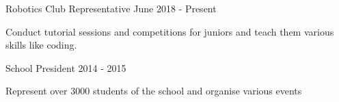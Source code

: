 

\begin{cventries}

  \projects
    {} %
    {Robotics Club Representative} %
    {June 2018 - Present} %
    {} %
    {
      \begin{por} %
        \item []{Conduct tutorial sessions and competitions for juniors and teach them various skills like coding. }
      \end{por}
    }

\projects
    {} %
    {School President} %
    {2014 - 2015} %
    {} %
    {
      \begin{por} %
        \item []{Represent over 3000 students of the school and organise various events}
      \end{por}
    }

\end{cventries}
